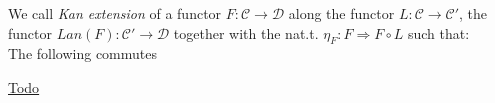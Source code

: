 \documentclass[preview]{standalone}
\begin{document}
	We call \emph{Kan extension} of a functor $F:\mathcal{C}\rightarrow\mathcal{D}$ along the functor $L:\mathcal{C} \rightarrow \mathcal{C}'$, 
	the functor $Lan(F):\mathcal{C}'\rightarrow \mathcal{D}$
	together with the nat.t. $\eta_F: F \Rightarrow F\circ L$ such that:\\
	The following commutes

	\href{https://ncatlab.org/nlab/show/Kan+extension#OrdinaryKanExtensions}{Todo}
\end{document}
